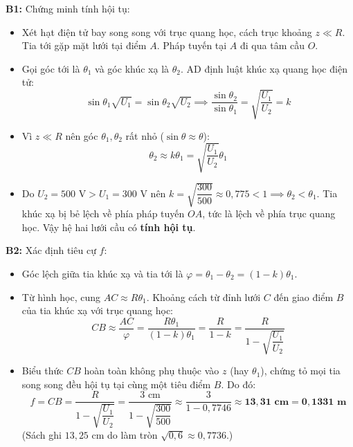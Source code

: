 \documentclass[11pt,a4paper]{article}
\renewcommand{\boldsymbol}[1]{\symbf{#1}}
\begin{document}
\textbf{B1:} Chứng minh tính hội tụ:
\begin{itemize}[leftmargin=*, topsep=1pt, itemsep=1pt]
  \item Xét hạt điện tử bay song song với trục quang học, cách trục khoảng $z \ll R$. Tia tới gặp mặt lưới tại điểm $A$. Pháp tuyến tại $A$ đi qua tâm cầu $O$.
  \item Gọi góc tới là $\theta_1$ và góc khúc xạ là $\theta_2$. AD định luật khúc xạ quang học điện tử:
  \begin{equation*}
      \sin\theta_1 \sqrt{U_1} = \sin\theta_2 \sqrt{U_2} \implies \frac{\sin\theta_2}{\sin\theta_1} = \sqrt{\frac{U_1}{U_2}} = k
  \end{equation*}
  \item Vì $z \ll R$ nên góc $\theta_1, \theta_2$ rất nhỏ ($\sin\theta \approx \theta$):
  \begin{equation*}
      \theta_2 \approx k \theta_1 = \sqrt{\frac{U_1}{U_2}} \theta_1
  \end{equation*}
  \item Do $U_2 = 500\text{ V} > U_1 = 300\text{ V}$ nên $k = \sqrt{\dfrac{300}{500}} \approx 0{,}775 < 1 \implies \theta_2 < \theta_1$. Tia khúc xạ bị bẻ lệch về phía pháp tuyến $OA$, tức là lệch về phía trục quang học. Vậy hệ hai lưới cầu có \textbf{tính hội tụ}.
\end{itemize}

\textbf{B2:} Xác định tiêu cự $f$:
\begin{itemize}[leftmargin=*, topsep=1pt, itemsep=1pt]
  \item Góc lệch giữa tia khúc xạ và tia tới là $\varphi = \theta_1 - \theta_2 = (1 - k)\theta_1$.
  \item Từ hình học, cung $AC \approx R \theta_1$. Khoảng cách từ đỉnh lưới $C$ đến giao điểm $B$ của tia khúc xạ với trục quang học:
  \begin{equation*}
      CB \approx \frac{AC}{\varphi} = \frac{R \theta_1}{(1 - k)\theta_1} = \frac{R}{1 - k} = \frac{R}{1 - \sqrt{\dfrac{U_1}{U_2}}}
  \end{equation*}
  \item Biểu thức $CB$ hoàn toàn không phụ thuộc vào $z$ (hay $\theta_1$), chứng tỏ mọi tia song song đều hội tụ tại cùng một tiêu điểm $B$. Do đó:
  \begin{equation*}
      f = CB = \frac{R}{1 - \sqrt{\dfrac{U_1}{U_2}}} = \frac{3\text{ cm}}{1 - \sqrt{\dfrac{300}{500}}} \approx \frac{3}{1 - 0{,}7746} \approx \boldsymbol{13{,}31\text{ cm}} = \boldsymbol{0{,}1331\text{ m}}
  \end{equation*}
  (Sách ghi $13{,}25\text{ cm}$ do làm tròn $\sqrt{0{,}6}\approx0{,}7736$.)
\end{itemize}
\end{document}

